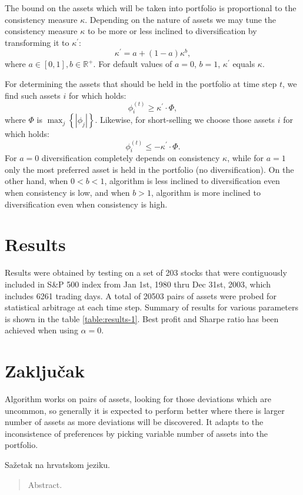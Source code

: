 \documentclass[lmodern, utf8, diplomski]{fer}
\begin{document}
  The bound on the assets which will be taken into portfolio is proportional to the consistency measure $\kappa$.
  Depending on the nature of assets we may tune the consistency measure $\kappa$ to be more or less inclined to diversification by transforming it to $\kappa^\prime$:
  \begin{equation}
  \kappa^\prime = a + (1 - a)\kappa^b,
  \end{equation}
  where $a \in [0, 1], b \in \mathbb{R}^+$.
  For default values of $a = 0$, $b = 1$, $\kappa^\prime$ equals $\kappa$.
  
  For determining the assets that should be held in the portfolio at time step $t$, we find such assets $i$ for which holds:
  \begin{equation}
  \phi_i^{(t)} \ge \kappa^\prime \cdot \Phi,
  \end{equation}
  where $\Phi$ is $\max_j \left\{ \left| \phi_j \right| \right\}$.
  Likewise, for short-selling we choose those assets $i$ for which holds:
  \begin{equation}
  \phi_i^{(t)} \le -\kappa^\prime \cdot \Phi.
  \end{equation}
  For $a = 0$ diversification completely depends on consistency $\kappa$, while for $a = 1$ only the most preferred asset is held in the portfolio (no diversification).
  On the other hand, when $0 < b < 1$, algorithm is less inclined to diversification even when consistency is low, and when $b > 1$, algorithm is more inclined to diversification even when consistency is high. 
  
  \chapter{Results}
  
  Results were obtained by testing on a set of 203 stocks that were contiguously included in S\&P 500 index from Jan 1st, 1980 thru Dec 31st, 2003, which includes 6261 trading days.
  A total of 20503 pairs of assets were probed for statistical arbitrage at each time step.
  Summary of results for various parameters is shown in the table \ref{table:results-1}.
  Best profit and Sharpe ratio has been achieved when using $\alpha = 0$.
  
  

  \chapter{Zaključak}
  Algorithm works on pairs of assets, looking for those deviations which are uncommon, so generally it is expected to perform better where there is larger number of assets as more deviations will be discovered.
  It adapts to the inconsistence of preferences by picking variable number of assets into the portfolio.




\begin{sazetak}
Sažetak na hrvatskom jeziku.

\end{sazetak}

\begin{abstract}
Abstract.

\end{abstract}
\end{document}
